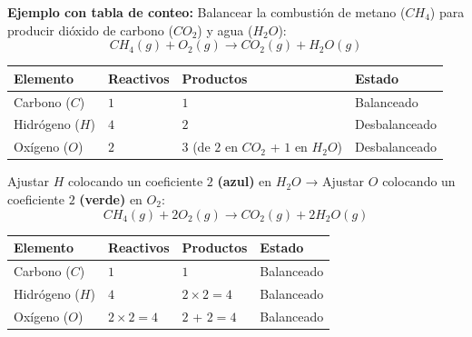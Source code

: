 \documentclass[
  spanish,
  letterpaper,
  12pt,
  oneside,
  open=any]{scrbook}
\newcounter{none} %
\begin{document}
\textbf{Ejemplo con tabla de conteo:} Balancear la combustión de metano
(\(CH_4\)) para producir dióxido de carbono (\(CO_2\)) y agua
(\(H_2O\)): \[CH_4(g) + O_2(g) \rightarrow CO_2(g) + H_2O(g)\]

{\def\LTcaptype{none} %
\begin{longtable}[]{@{}
  >{\raggedright\arraybackslash}p{}
  >{\raggedright\arraybackslash}p{}
  >{\raggedright\arraybackslash}p{}
  >{\raggedright\arraybackslash}p{}@{}}
\toprule\noalign{}
\begin{minipage}[b]{\linewidth}\raggedright
Elemento
\end{minipage} & \begin{minipage}[b]{\linewidth}\raggedright
Reactivos
\end{minipage} & \begin{minipage}[b]{\linewidth}\raggedright
Productos
\end{minipage} & \begin{minipage}[b]{\linewidth}\raggedright
Estado
\end{minipage} \\
\midrule\noalign{}
\endhead
\bottomrule\noalign{}
\endlastfoot
Carbono (\(C\)) & \(1\) & \(1\) & Balanceado \\
Hidrógeno (\(H\)) & \(4\) & \(2\) & Desbalanceado \\
Oxígeno (\(O\)) & \(2\) & \(3\) (de \(2\) en \(CO_2\) + \(1\) en
\(H_2O\)) & Desbalanceado \\
\end{longtable}
}

Ajustar \(H\) colocando un coeficiente \(2\) \textbf{(azul)} en \(H_2O\)
→ Ajustar \(O\) colocando un coeficiente \(2\) \textbf{(verde)} en
\(O_2\): \[CH_4(g) + 2O_2(g) \rightarrow CO_2(g) + 2H_2O(g)\]

{\def\LTcaptype{none} %
\begin{longtable}[]{@{}llll@{}}
\toprule\noalign{}
Elemento & Reactivos & Productos & Estado \\
\midrule\noalign{}
\endhead
\bottomrule\noalign{}
\endlastfoot
Carbono (\(C\)) & \(1\) & \(1\) & Balanceado \\
Hidrógeno (\(H\)) & \(4\) & \(2 \times 2 = 4\) & Balanceado \\
Oxígeno (\(O\)) & \(2 \times 2 = 4\) & \(2\) + \(2 = 4\) & Balanceado \\
\end{longtable}
}
\end{document}
